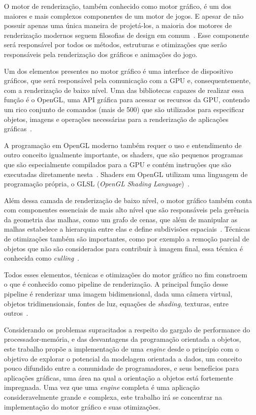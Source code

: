 \documentclass[11pt]{article}
\begin{document}
O motor de renderização, também conhecido como motor gráfico, é um dos maiores e mais complexos componentes de um motor de 
jogos. E apesar de não possuir apenas uma única maneira de projetá-los, a maioria dos motores de renderização modernos 
seguem filosofias de design em comum~\cite{gregory2009game}. Esse componente será responsável por todos os métodos, 
estruturas e otimizações que serão responsáveis pela renderização dos gráficos e animações do jogo. 

Um dos elementos 
presentes no motor gráfico é uma interface de dispositivo gráficos, que será responsável pela comunicação com a GPU 
e, consequentemente, com a renderização de baixo nível. Uma das bibliotecas capazes de realizar essa função é o OpenGL, uma 
API gráfica para acessar os recursos da GPU, contendo um rico conjunto de comandos (mais de 500) que são utilizados para 
especificar objetos, imagens e operações necessárias para a renderização de aplicações gráficas~\cite{shreiner2013opengl}.

A programação em OpenGL moderno também requer o uso e entendimento de outro conceito igualmente importante, os shaders, que 
são pequenos programas que são especialmente compilados para a GPU e contém instruções que são executadas diretamente 
nesta~\cite{shreiner2013opengl}. Shaders em OpenGL utilizam uma linguagem de programação própria, o GLSL (\textit{OpenGL 
Shading Language})~\cite{shreiner2013opengl}.

Além dessa camada de renderização de baixo nível, o motor gráfico também conta com componentes essenciais de mais alto nível 
que são responsáveis pela gerência da geometria das malhas, como um grafo de cenas, que além de manipular as malhas estabelece 
a hierarquia entre elas e define subdivisões espaciais~\cite{gregory2009game}. Técnicas de otimizações também são importantes, 
como por exemplo a remoção parcial de objetos que não são considerados para contribuir à imagem final, essa técnica é 
conhecida como \textit{culling}~\cite{akenine2008real}.

Todos esses elementos, técnicas e otimizações do motor gráfico no fim constroem o que é conhecido como pipeline de 
renderização. A principal função desse pipeline é renderizar uma imagem bidimensional, 
dada uma câmera virtual, objetos tridimensionais, fontes de luz, equações de \textit{shading}, texturas, entre 
outros~\cite{akenine2008real}.

Considerando os problemas supracitados a respeito do gargalo de performance do processador-memória, e das desvantagens da 
programação orientada a objetos, este trabalho propõe a implementação de uma \textit{engine} desde o princípio com o objetivo de 
explorar o potencial da modelagem orientada a dados, um conceito pouco difundido entre a comunidade de programadores, 
e seus benefícios para aplicações gráficas, uma área na qual a orientação a objetos está fortemente impregnada. Uma vez
que uma \textit{engine} completa é uma aplicação consideravelmente grande e complexa, este trabalho irá se concentrar na implementação
do motor gráfico e suas otimizações.
\end{document}
